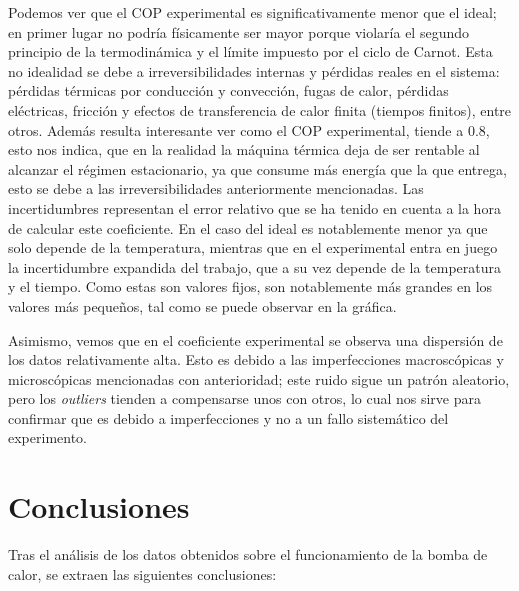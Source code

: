 \documentclass[a4paper,11pt]{article}
\begin{document}
Podemos ver que el COP experimental es significativamente menor que el ideal; en primer lugar no podría físicamente ser mayor porque violaría el segundo principio de la termodinámica y el límite impuesto por el ciclo de Carnot. Esta no idealidad se debe a irreversibilidades internas y pérdidas reales en el sistema: pérdidas térmicas por conducción y convección, fugas de calor, pérdidas eléctricas, fricción y efectos de transferencia de calor finita (tiempos finitos), entre otros.
Además resulta interesante ver como el COP experimental, tiende a 0.8, esto nos indica, que en la realidad la máquina térmica deja de ser rentable al alcanzar el régimen estacionario,
ya que consume más energía que la que entrega, esto se debe a las irreversibilidades anteriormente mencionadas. 
Las incertidumbres representan el error relativo que se ha tenido en cuenta a la hora de calcular este coeficiente. En el caso del ideal es notablemente menor ya que solo depende de la temperatura, mientras que en el experimental entra en juego la incertidumbre expandida del trabajo, que a su vez depende de la temperatura y el tiempo. Como estas son valores fijos, son notablemente más grandes en los valores más pequeños, tal como se puede observar en la gráfica.

Asimismo, vemos que en el coeficiente experimental se observa una dispersión de los datos relativamente alta. Esto es debido a las imperfecciones macroscópicas y microscópicas mencionadas con anterioridad; este ruido sigue un patrón aleatorio, pero los \textit{outliers} tienden a compensarse unos con otros, lo cual nos sirve para confirmar que es debido a imperfecciones y no a un fallo sistemático del experimento.

\section{Conclusiones}
Tras el análisis de los datos obtenidos sobre el funcionamiento de la bomba de calor, se extraen las siguientes conclusiones:
\end{document}
